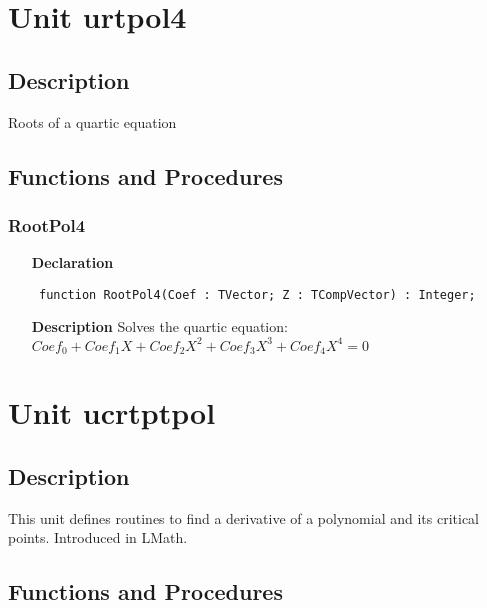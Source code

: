 \documentclass[12pt,a4paper,oneside]{report}
\newcommand{\lmath}[1]{   %
	\marginpar{\vspace{#1} 
		\begin{flushright}
			LMath
	\end{flushright} }
}
\newcommand{\declarationitem}[1]{\textbf{#1}}
\newcommand{\descriptiontitle}[1]{\textbf{#1}}
\newcommand{\code}[1]{\texttt{#1}}
\begin{document}
\section{Unit urtpol4}
\label{urtpol4}
\subsection{Description} Roots of a quartic equation
\subsection{Functions and Procedures}
\subsubsection{RootPol4}
\label{urtpol4-RootPol4}
\begin{itemize}\item[\declarationitem{Declaration}\hfill]
	\begin{flushleft}
		\code{
			function RootPol4(Coef : TVector; Z : TCompVector) : Integer;}
		
	\end{flushleft}
	
	\par
	\item[\descriptiontitle{Description}]
	Solves the quartic equation:\\
	$Coef_0 + Coef_1 X + Coef_2 X^2 + Coef_3 X^3 + Coef_4 X^4 = 0$
	
\end{itemize}
\section{Unit ucrtptpol}\label{unit-ucrtptpol}\lmath{-24pt}
\subsection{Description}
This unit defines routines to find a derivative of a polynomial and its critical points. Introduced in LMath.
\label{ucrtptpol}
\subsection{Functions and Procedures}
\end{document}
